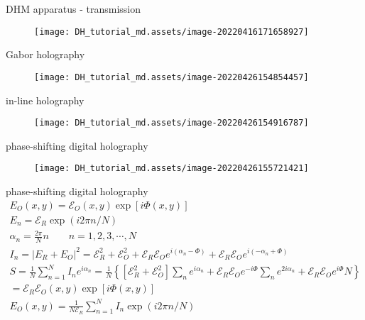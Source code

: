 \documentclass[t, aspectratio=169]{beamer}
\begin{document}
\begin{frame}{DHM apparatus - transmission}
	\begin{figure}
		\texttt{[image: DH\_tutorial\_md.assets/image-20220416171658927]}
	\end{figure}
\end{frame}


\begin{frame}{Gabor holography}
	\begin{figure}
		\texttt{[image: DH\_tutorial\_md.assets/image-20220426154854457]}
	\end{figure}
\end{frame}


\begin{frame}{in-line holography}
	\begin{figure}
		\texttt{[image: DH\_tutorial\_md.assets/image-20220426154916787]}
	\end{figure}
\end{frame}


\begin{frame}{phase-shifting digital holography}
	\begin{figure}
		\texttt{[image: DH\_tutorial\_md.assets/image-20220426155721421]}
	\end{figure}
\end{frame}


\begin{frame}{phase-shifting digital holography}
	\begin{gather*}
E_O(x,y) = \mathcal{E}_O(x,y)\exp[i\Phi(x,y)] \\
E_n = \mathcal{E}_R \exp(i2\pi n/N) \\
\alpha_n = \frac{2\pi}{N}n \qquad n=1,2,3,\cdots,N \\
I_n = |E_R + E_O|^2 = \mathcal{E}_R^2 + \mathcal{E}_O^2 + \mathcal{E}_R\mathcal{E}_O e^{i(\alpha_n-\Phi)} + \mathcal{E}_R\mathcal{E}_O e^{i(-\alpha_n+\Phi)} \\
S=\frac{1}{N}\sum_{n=1}^N I_n e^{i\alpha_n} = \frac{1}{N}\left\{\left[\mathcal{E}_R^2 + \mathcal{E}_O^2 \right]\sum_n e^{i\alpha_n} + \mathcal{E}_R\mathcal{E}_O e^{-i\Phi}\sum_n e^{2i\alpha_n} + \mathcal{E}_R\mathcal{E}_O e^{i\Phi}N \right\} \\
= \mathcal{E}_R\mathcal{E}_O(x,y)\exp[i\Phi(x,y)] \\
E_O(x,y) = \frac{1}{N\mathcal E_R}\sum_{n=1}^N I_n \exp(i2\pi n/N)
	\end{gather*}
\end{frame}
\end{document}
